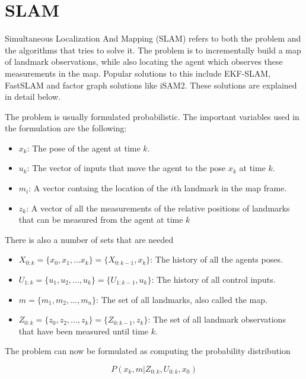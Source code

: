 \section{SLAM}

Simultaneous Localization And Mapping (SLAM)\cite{FirstSLAMMention}\cite{SLAMIntro} refers to both the problem and the algorithms that tries to solve it. The problem is to incrementally build a map of landmark observations, while also locating the agent which observes these measurements in the map. Popular solutions to this include EKF-SLAM\cite{EKFSLAM}, FastSLAM\cite{FastSLAM1} and factor graph\cite{Dellaert} solutions like iSAM2\cite{iSAM2}. These solutions are explained in detail below. 

The problem is usually formulated probabilistic. The important variables used in the formulation are the following:

\begin{itemize}
    \item $x_k$: The pose of the agent at time $k$. 
    \item $u_k$: The vector of inputs that move the agent to the pose $x_k$ at time $k$.
    \item $m_i$: A vector containg the location of the $i$th landmark in the map frame. 
    \item $z_k$: A vector of all the measurements of the relative positions of landmarks that can be measured from the agent at time $k$ 
\end{itemize}

There is also a number of sets that are needed

\begin{itemize}
    \item $X_{0:k} = \{x_0,x_1,...x_k\} = \{X_{0:k-1},x_k\}$: The history of all the agents poses.
    \item $U_{1:k} = \{u_1,u_2,...,u_k\} = \{U_{1:k-1},u_k\}$: The history of all control inputs.
    \item $m=\{m_1,m_2,...,m_n\}$: The set of all landmarks, also called the map.
    \item $Z_{0:k}=\{z_0,z_2,...,z_k\} = \{Z_{0:k-1},z_k\}$: The set of all landmark observations that have been measured until time $k$.
\end{itemize}

The problem can now be formulated as computing the probability distribution 

\begin{equation}
    P(x_k,m|Z_{0:k},U_{0:k},x_0)
\end{equation}

